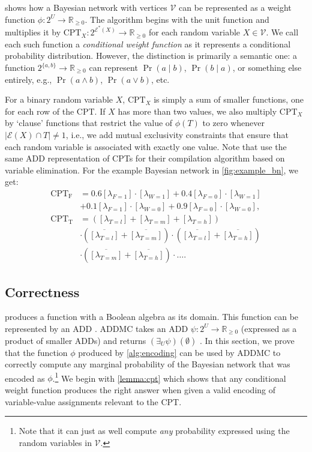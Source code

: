  shows how a Bayesian network with vertices $\mathcal{V}$
can be represented as a weight function $\phi\colon 2^U \to \mathbb{R}_{\ge 0}$.
The algorithm begins with the unit function and multiplies it by
$\mathrm{CPT}_X\colon 2^{\mathcal{E}^*(X)} \to \mathbb{R}_{\ge 0}$ for each
random variable $X \in \mathcal{V}$. We call each such function a
\emph{conditional weight function} as it represents a conditional probability
distribution. However, the distinction is primarily a semantic one: a function
$2^{\{a, b\}} \to \mathbb{R}_{\ge 0}$ can represent $\Pr(a \mid b)$, $\Pr(b \mid
a)$, or something else entirely, e.g., $\Pr(a \land b)$, $\Pr(a \lor b)$, etc.

For a binary random variable $X$, $\mathrm{CPT}_X$ is simply a sum of smaller
functions, one for each row of the CPT. If $X$ has more than two values, we also
multiply $\mathrm{CPT}_X$ by `clause' functions that restrict the value of
$\phi(T)$ to zero whenever $|\mathcal{E}(X) \cap T| \ne 1$, i.e., we add mutual
exclusivity constraints that ensure that each random variable is associated with
exactly one value. Note that \citet{DBLP:conf/ijcai/ChaviraD07} use the same ADD
representation of CPTs for their compilation algorithm based on variable
elimination. For the example Bayesian network in \cref{fig:example_bn}, we get:
\begin{align*}
  \mathrm{CPT_F} &= 0.6[\lambda_{F=1}] \cdot [\lambda_{W=1}] + 0.4[\lambda_{F=0}] \cdot [\lambda_{W=1}] \\
                 &+ 0.1[\lambda_{F=1}] \cdot [\lambda_{W=0}] + 0.9[\lambda_{F=0}] \cdot [\lambda_{W=0}], \\
  \mathrm{CPT_T} &= ([\lambda_{T=l}] + [\lambda_{T=m}] + [\lambda_{T=h}]) \\
                 &\cdot (\overline{[\lambda_{T=l}]} + \overline{[\lambda_{T=m}]}) \cdot (\overline{[\lambda_{T=l}]} + \overline{[\lambda_{T=h}]}) \\
                 &\cdot (\overline{[\lambda_{T=m}]} + \overline{[\lambda_{T=h}]}) \cdot \dots.
\end{align*}

\subsection{Correctness}

 produces a function with a Boolean algebra as its domain.
This function can be represented by an ADD
\citep{DBLP:journals/fmsd/BaharFGHMPS97}. \textsf{ADDMC} takes an ADD
$\psi\colon 2^{U} \to \mathbb{R}_{\ge 0}$ (expressed as a product of smaller
ADDs) and returns $(\exists_U\psi)(\emptyset)$ \citep{DBLP:conf/aaai/DudekPV20}.
In this section, we prove that the function $\phi$ produced by
\cref{alg:encoding} can be used by \textsf{ADDMC} to correctly compute any
marginal probability of the Bayesian network that was encoded as
$\phi$.\footnote{Note that it can just as well compute \emph{any} probability
  expressed using the random variables in $\mathcal{V}$.} We begin with
\cref{lemma:cpt} which shows that any conditional weight function produces the
right answer when given a valid encoding of variable-value assignments relevant
to the CPT.

